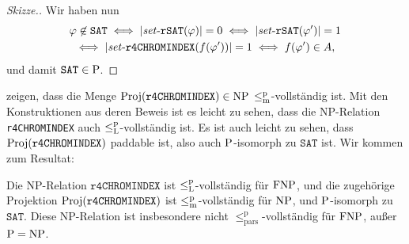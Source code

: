 \begin{proof}[Skizze.]
    Wir haben nun
    \begin{gather*} \phi\not\in\mathtt{SAT} \iff |\fset{}\mathtt{rSAT}(\phi)|=0 \iff |\fset{}\mathtt{rSAT}(\phi')|=1 \\ \iff |\fset{}\mathtt{r4CHROMINDEX}(f(\phi'))|=1 \iff f(\phi') \in A, \end{gather*}
    und damit $\mathtt{SAT}\in\P$.
\end{proof}

\textcite{leven_np_1983} zeigen, dass die Menge $\Proj(\mathtt{r4CHROMINDEX})\in\NP$ $\leqmp$-vollständig ist. 
Mit den Konstruktionen aus deren Beweis ist es leicht zu sehen, dass die NP-Relation \texttt{r4CHROMINDEX} auch $\leqlp$-vollständig ist. 
Es ist auch leicht zu sehen, dass $\Proj(\mathtt{r4CHROMINDEX})$ paddable ist, also  auch $\P$-isomorph zu $\mathtt{SAT}$ ist.
Wir kommen zum Resultat:
\begin{observation}
    Die NP-Relation $\mathtt{r4CHROMINDEX}$ ist $\leqlp$-vollständig für $\FNP$, und die zugehörige Projektion  $\Proj(\mathtt{r4CHROMINDEX})$ ist $\leqmp$-vollständig für $\NP$, und $\P$-isomorph zu $\mathtt{SAT}$.
    Diese NP-Relation ist insbesondere nicht $\leq_\mathrm{pars}^\mathrm p$-vollständig für $\FNP$, außer $\P=\NP$.
\end{observation}

